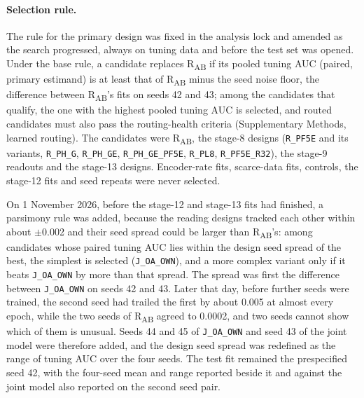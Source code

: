 \paragraph{Selection rule.} The rule for the primary design was fixed in the
analysis lock and amended as the search progressed, always on tuning data and
before the test set was opened. Under the base rule, a candidate replaces
R\textsubscript{AB} if its pooled tuning AUC (paired, primary estimand) is at
least that of R\textsubscript{AB} minus the seed noise floor, the difference
between R\textsubscript{AB}'s fits on seeds 42 and 43; among the candidates that
qualify, the one with the highest pooled tuning AUC is selected, and routed
candidates must also pass the routing-health criteria
(Supplementary Methods, learned routing). The candidates were R\textsubscript{AB}, the
stage-8 designs (\texttt{R\_PF5E} and its variants, \texttt{R\_PH\_G},
\texttt{R\_PH\_GE}, \texttt{R\_PH\_GE\_PF5E}, \texttt{R\_PL8},
\texttt{R\_PF5E\_R32}), the stage-9 readouts and the stage-13 designs.
Encoder-rate fits, scarce-data fits, controls, the stage-12 fits and seed
repeats were never selected.

On 1 November 2026, before the stage-12 and stage-13 fits had finished, a
parsimony rule was added, because the reading designs tracked each other within
about $\pm$0.002 and their seed spread could be larger than
R\textsubscript{AB}'s: among candidates whose paired tuning AUC lies within the
design seed spread of the best, the simplest is selected (\texttt{J\_OA\_OWN}),
and a more complex variant only if it beats \texttt{J\_OA\_OWN} by more than that
spread. The spread was first the difference between \texttt{J\_OA\_OWN} on seeds
42 and 43. Later that day, before further seeds were trained, the second seed
had trailed the first by about 0.005 at almost every epoch, while the two seeds
of R\textsubscript{AB} agreed to 0.0002, and two seeds cannot show which of them
is unusual. Seeds 44 and 45 of \texttt{J\_OA\_OWN} and seed 43 of the joint model
were therefore added, and the design seed spread was redefined as the range of
tuning AUC over the four seeds. The test fit remained the prespecified seed 42,
with the four-seed mean and range reported beside it and \opera{} against the
joint model also reported on the second seed pair.

